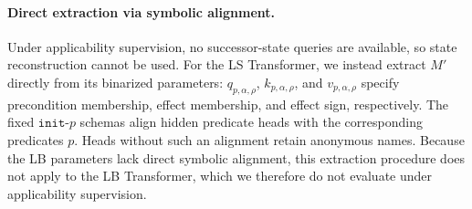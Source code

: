 
\paragraph{Direct extraction via symbolic alignment.}
Under applicability supervision, no successor-state queries are available, so state reconstruction cannot be used. For the LS Transformer, we instead extract $M'$ directly from its binarized parameters:
$q_{p,\alpha,\rho}$, $k_{p,\alpha,\rho}$, and
$v_{p,\alpha,\rho}$ specify precondition membership, effect membership, and effect sign, respectively. The fixed $\texttt{init-}p$ schemas align hidden predicate heads with the corresponding predicates $p$. Heads without such an alignment retain anonymous names. Because the LB parameters lack direct symbolic alignment, this extraction procedure does not apply to the LB Transformer, which we therefore do not evaluate under applicability supervision.


